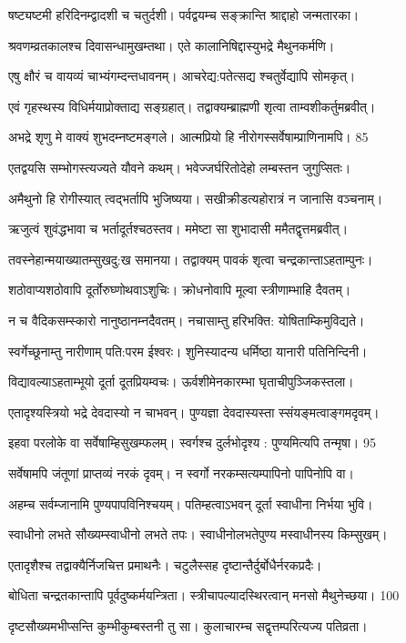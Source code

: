   षष्ट्यष्टमी हरिदिनम्द्वादशी च चतुर्दशी।
पर्वद्वयम्च सङ्क्रान्ति श्राद्दाहो जन्मतारका।

 श्रवणम्व्रतकालश्च दिवासन्धामुखम्तथा।
 एते कालानिषिद्दास्युभद्रे मैथुनकर्मणि।

 एषु क्षौरं च वायव्यं चाभ्यंगम्दन्तधावनम्।
 आचरेद्य:पतेत्सद्य श्चतुर्वेद्यापि सोमकृत्।

 एवं गृहस्थस्य विधिर्मयाप्रोक्ताद्य सङ्ग्रहात्।
 तद्वाक्यम्ब्राह्मणी शृत्वा ताम्वशीकर्तुमब्रवीत्।

 अभद्रे शृणु मे वाक्यं शुभदम्नष्टमङ्गले।
 आत्मप्रियो हि नीरोगस्सर्वेषाम्प्राणिनामपि। 85

  एतद्वयसि सम्भोगस्त्यज्यते यौवने कथम्।
 भवेज्जर्घरितोदेहो लम्बस्तन जुगुप्सितः।

 अमैथुनो हि रोगीस्यात् त्वद्भर्तापि भुजिष्यया।
 सखीक्रीडत्यहोरात्रं न जानासि वञ्चनाम्।

 ऋजुत्वं शुवंद्धभावा च भर्तादूर्तश्चठस्तव।
 ममेष्टा सा शुभादासी ममैतद्वृत्तमब्रवीत्।

 तवस्नेहान्मयाख्यातम्सुखदु:ख समानया।
 तद्वाक्यम् पावकं शृत्वा चन्द्रकान्ताऽहताम्पुनः।

 शठोवाप्यशठोवापि दूर्तोरुघ्णोथवाऽशुचिः।
 क्रोधनोवापि मूल्वा स्त्रीणाम्भाहि दैवतम्।

 न च वैदिकसम्स्कारो नानुष्ठानम्नदैवतम्।
 नचासाम्तु हरिभक्ति: योषिताम्किमुविद्यते।

 स्वर्गेच्छूनाम्तु नारीणाम् पति:परम ईश्वरः।
शुनिस्यादन्य धर्मिष्ठा यानारी पतिनिन्दिनी।

 विद्यावल्याऽहताम्भूयो दूर्ता दूतप्रियम्वचः।
 ऊर्वशीमेनकारम्भा घृताचीपुञ्जिकस्तला।

 एतादृश्यस्त्रियो भद्रे देवदास्यो न चाभवन्।
 पुण्यज्ञा देवदास्यस्ता स्संयङ्मत्वाङ्गमदृवम्।

 इहवा परलोके वा सर्वेषाम्हिसुखम्फलम्।
 स्वर्गश्च दुर्लभोदृश्य : पुण्यमित्यपि तन्मृषा। 95

  सर्वेषामपि जंतूणां प्राप्तव्यं नरकं दृवम्।
 न स्वर्गो नरकम्सत्यम्पापिनो पापिनोपि वा।

 अहम्च सर्वम्जानामि पुण्यपापविनिश्चयम्।
 पतिम्हत्वाऽभवन् दूर्ता स्वाधीना निर्भया भुवि।

 स्वाधीनो लभते सौख्यम्स्वाधीनो लभते तपः।
 स्वाधीनोलभतेपुण्य मस्वाधीनस्य किम्सुखम्।

 एतादृशैश्च तद्वाक्यैर्निजचित्त प्रमाथनैः।
 चटुलैस्सह दृष्टान्तैर्दुर्बोधैर्नरकप्रदैः।

 बोधिता चन्द्रतकान्तापि पूर्वदुष्कर्मयन्त्रिता।
 स्त्रीचापल्यादस्थिरत्वान् मनसो मैथुनेच्छया। 100

  दृष्टसौख्यमभीप्सन्ति कुम्भीकुम्बस्तनी तु सा।
 कुलाचारम्च सद्वृत्तम्परित्यज्य पतिव्रता।

